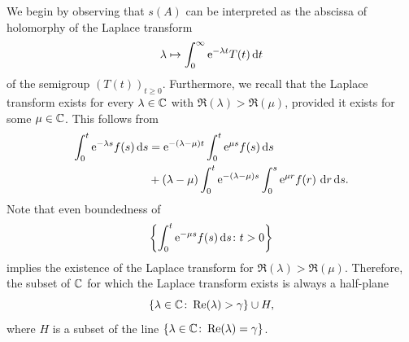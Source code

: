 We begin by observing that $s(A)$ can be interpreted as the abscissa of holomorphy of the Laplace transform 
%
\[
	\lambda \mapsto \int_{0}^{\infty} \mathrm{e}^{-\lambda t} T(t)  \mathop{}\!\mathrm{d}{t} 
\]
%
of the semigroup $(T(t))_{t \geq 0}$.
Furthermore, we recall that the Laplace transform exists for every $\lambda \in \mathbb{C}$ with $\Re(\lambda) > \Re(\mu)$, provided it exists for some $\mu\in\mathbb{C}$.
This follows from 
\begin{equation}\label{eq:a4-1.1}
\begin{split}
\int_0^t \mathrm{e}^{-\lambda s} f(s) \mathop{}\!\mathrm{d}{s} &= \mathrm{e}^{-(\lambda-\mu)t} \int_{0}^{t} \mathrm{e}^{\mu s} f(s)  \mathop{}\!\mathrm{d}{s} \\ 
&+ (\lambda - \mu) \int_{0}^{t} \mathrm{e}^{-(\lambda-\mu)s} \int_{0}^{s} \mathrm{e}^{\mu r} f(r) \,\mathop{}\!\mathrm{d}{r} \mathop{}\!\mathrm{d}{s}  . 
\end{split}
\end{equation}
Note that even boundedness of 
\[
\left\{ \int_{0}^{t} \mathrm{e}^{-\mu s}f(s)  \mathop{}\!\mathrm{d}{s} \colon t > 0\right\}
\]
implies the existence of the Laplace transform for $\Re(\lambda) > \Re(\mu)$. 
Therefore, the subset of\/ $\mathbb{C}$ for which the Laplace transform exists is always a half-plane 
%
\[
	\{\lambda \in \mathbb{C}\colon\mathop{}\!\mathrm{Re}(\lambda)\allowbreak > \gamma\} \cup H , 
\]
%
where $H$ is a subset of the line $\{\lambda \in \mathbb{C}\colon\mathop{}\!\mathrm{Re}(\lambda) = \gamma\}$.

